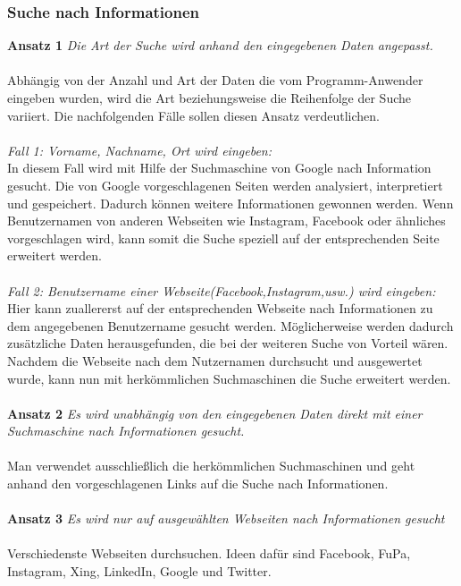 		\subsubsection{Suche nach Informationen}
		\label{sec:Suche nach Information}
		{\bf Ansatz 1} \textit{Die Art der Suche wird anhand den eingegebenen Daten angepasst.}\\\\
		Abhängig von der Anzahl und Art der Daten die vom Programm-Anwender eingeben wurden, wird die Art beziehungsweise die Reihenfolge der Suche variiert. Die nachfolgenden Fälle sollen diesen Ansatz verdeutlichen.\\\\
		\textit{Fall 1: Vorname, Nachname, Ort wird eingeben:}\\
		In diesem Fall wird mit Hilfe der Suchmaschine von Google nach Information gesucht. Die von Google vorgeschlagenen Seiten werden analysiert, interpretiert und gespeichert. Dadurch können weitere Informationen gewonnen werden. Wenn Benutzernamen von anderen Webseiten wie Instagram, Facebook oder ähnliches vorgeschlagen wird, kann somit die Suche speziell auf der entsprechenden Seite erweitert werden.\\\\
		\textit{Fall 2: Benutzername einer Webseite(Facebook,Instagram,usw.) wird eingeben:}\\
		Hier kann zuallererst auf der entsprechenden Webseite nach Informationen zu dem angegebenen Benutzername gesucht werden. Möglicherweise werden dadurch zusätzliche Daten herausgefunden, die bei der weiteren Suche von Vorteil wären.\\
		Nachdem die Webseite nach dem Nutzernamen durchsucht und ausgewertet wurde, kann nun mit herkömmlichen Suchmaschinen die Suche erweitert werden.\\\\
		{\bf Ansatz 2} \textit{Es wird unabhängig von den eingegebenen Daten direkt mit einer Suchmaschine nach Informationen gesucht.}\\\\
		Man verwendet ausschließlich die herkömmlichen Suchmaschinen und geht anhand den vorgeschlagenen Links auf die Suche nach Informationen.\\\\
		{\bf Ansatz 3} \textit{Es wird nur auf ausgewählten Webseiten nach Informationen gesucht}\\\\
		Verschiedenste Webseiten durchsuchen. Ideen dafür sind Facebook, FuPa, Instagram, Xing, LinkedIn, Google und Twitter.\\
		
